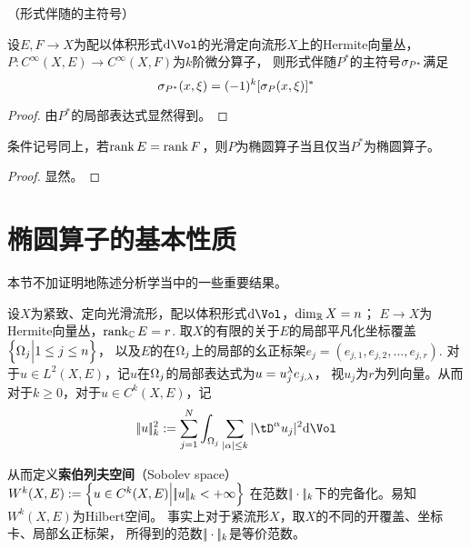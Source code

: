 \begin{cor}（形式伴随的主符号）

设$E,F\to X$为配以体积形式$\td\Vol$的光滑定向流形$X$上的Hermite向量丛，
$P:C^\infty(X,E)\to C^\infty(X,F)$为$k$阶微分算子，
则形式伴随$P^*$的主符号$\sigma_{P^*}$满足
$$
  \sigma_{P^*}(x,\xi)=(-1)^k[\sigma_P(x,\xi)]^*
$$
\end{cor}

\begin{proof}
  由$P^*$的局部表达式显然得到。
\end{proof}

\begin{cor}
条件记号同上，若$\operatorname{rank} E=\operatorname{rank} F$，则$P$为椭圆算子当且仅当$P^*$为椭圆算子。
\end{cor}

\begin{proof}
显然。
\end{proof}


\section{椭圆算子的基本性质}

本节不加证明地陈述分析学当中的一些重要结果。

设$X$为紧致、定向光滑流形，配以体积形式$\td\Vol$，$\dim_{\mathbb{R}}X=n$；
$E\to X$为Hermite向量丛，$\operatorname{rank}_{\mathbb{C}}E=r$.
取$X$的有限的关于$E$的局部平凡化坐标覆盖$\Big\{ \Omega_j \Big| 1\leq j\leq n \Big\}$，
以及$E$的在$\Omega_j$上的局部的幺正标架$e_j=(e_{j,1},e_{j,2},...,e_{j,r})$.
对于$u\in L^2(X,E)$，记$u$在$\Omega_j$的局部表达式为$u=u_j^\lambda e_{j,\lambda}$，
视$u_j$为$r$为列向量。从而对于$k\geq 0$，对于$u\in C^k(X,E)$，记
$$
  \norm{u}_k^2
:=
  \sum_{j=1}^{N}
    \int_{\Omg_j}
      \sum_{|\afa|\leq k}
        |\tD^\afa u_j|^2\td\Vol
$$

从而定义\textbf{索伯列夫空间}（Sobolev space）
$W^k(X,E):=\Big\{ u\in C^k(X,E) \Big| |\!|u|\!|_k<+\infty \Big\}$
在范数$|\!|\cdot|\!|_k$下的完备化。易知$W^k(X,E)$为Hilbert空间。
事实上对于紧流形$X$，取$X$的不同的开覆盖、坐标卡、局部幺正标架，
所得到的范数$|\!|\cdot|\!|_k$是等价范数。

